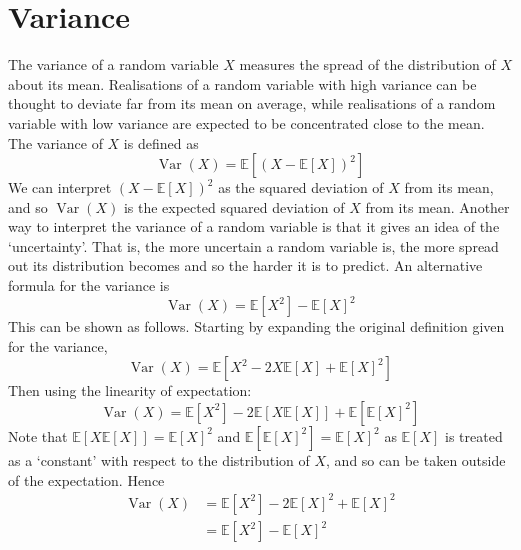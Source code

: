 \documentclass[11pt]{report} %
\begin{document}
\section{Variance}

The variance of a random variable $X$ measures the spread of the distribution of $X$ about its mean. Realisations of a random variable with high variance can be thought to deviate far from its mean on average, while realisations of a random variable with low variance are expected to be concentrated close to the mean. The variance of $X$ is defined as
\begin{equation}
\operatorname{Var}\left(X\right) = \mathbb{E}\left[\left(X - \mathbb{E}\left[X\right]\right)^{2}\right] 
\end{equation}
We can interpret $\left(X - \mathbb{E}\left[X\right]\right)^{2}$ as the squared deviation of $X$ from its mean, and so $\operatorname{Var}\left(X\right)$ is the expected squared deviation of $X$ from its mean. Another way to interpret the variance of a random variable is that it gives an idea of the `uncertainty'. That is, the more uncertain a random variable is, the more spread out its distribution becomes and so the harder it is to predict. An alternative formula for the variance is
\begin{equation}
\operatorname{Var}\left(X\right) = \mathbb{E}\left[X^{2}\right] - \mathbb{E}\left[X\right]^{2}
\end{equation}
This can be shown as follows. Starting by expanding the original definition given for the variance,
\begin{equation}
\operatorname{Var}\left(X\right) = \mathbb{E}\left[X^{2} - 2X\mathbb{E}\left[X\right] + \mathbb{E}\left[X\right]^{2}\right] 
\end{equation}
Then using the linearity of expectation:
\begin{equation}
\operatorname{Var}\left(X\right) = \mathbb{E}\left[X^{2}\right] - 2\mathbb{E}\left[X\mathbb{E}\left[X\right]\right] + \mathbb{E}\left[\mathbb{E}\left[X\right]^{2}\right] 
\end{equation}
Note that $\mathbb{E}\left[X\mathbb{E}\left[X\right]\right] = \mathbb{E}\left[X\right]^{2}$ and $\mathbb{E}\left[\mathbb{E}\left[X\right]^{2}\right] = \mathbb{E}\left[X\right]^{2}$ as $\mathbb{E}\left[X\right]$ is treated as a `constant' with respect to the distribution of $X$, and so can be taken outside of the expectation. Hence
\begin{align}
\operatorname{Var}\left(X\right) &= \mathbb{E}\left[X^{2}\right] - 2\mathbb{E}\left[X\right]^{2} + \mathbb{E}\left[X\right]^{2} \\
&= \mathbb{E}\left[X^{2}\right] - \mathbb{E}\left[X\right]^{2}
\end{align}
\end{document}
